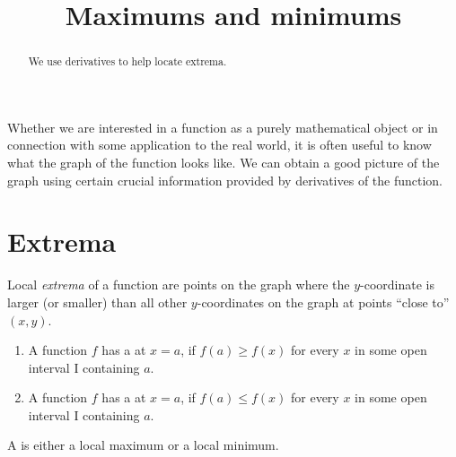 \documentclass{ximera}
\title[Dig-In]{Maximums and minimums}
\begin{document}
\begin{abstract}
We use derivatives to help locate extrema.  
\end{abstract}
\maketitle


Whether we are interested in a function as a purely mathematical
object or in connection with some application to the real world, it is
often useful to know what the graph of the function looks like. We can
obtain a good picture of the graph using certain crucial information
provided by derivatives of the function.

\section{Extrema}

Local \textit{extrema} of a function are points on the graph where the
$y$-coordinate is larger (or smaller) than all other $y$-coordinates
on the graph at points ``close to'' $(x,y)$. 

\begin{definition}\hfil{}
\begin{enumerate}
\item A function $f$ has a  at $x=a$, if $f(a)\ge
  f(x)$ for every $x$ in some open interval I containing $a$.
\item A function $f$ has a  at $x=a$, if $f(a)\le
  f(x)$ for every $x$  in some open interval I containing $a$.
\end{enumerate}
A  is either a local
maximum or a local minimum.
\end{definition}
\end{document}
